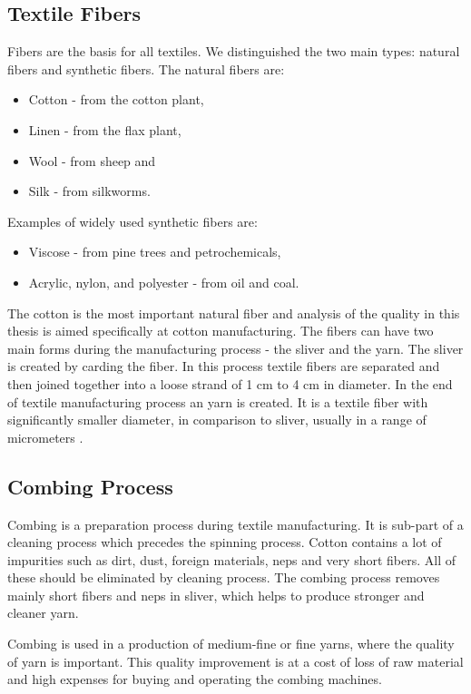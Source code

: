 \documentclass[twoside]{ctuthesis}
\theoremstyle{plain}
\theoremstyle{definition}
\theoremstyle{note}
\begin{document}
\subsection{Textile Fibers}
\label{textileFibers}
Fibers are the basis for all textiles. We distinguished the two main types: natural fibers and synthetic fibers. The natural fibers are:
\begin{itemize}
	\setlength{\itemsep}{5pt}
\item Cotton - from the cotton plant,
\item Linen - from the flax plant,
\item Wool - from sheep and
\item Silk - from silkworms.
\end{itemize}
Examples of widely used synthetic fibers are:
\begin{itemize}
	\setlength{\itemsep}{5pt}
\item Viscose - from pine trees and petrochemicals,

\item Acrylic, nylon, and polyester - from oil and coal. 
\end{itemize}
The cotton is the most important natural fiber and analysis of the quality in this thesis is aimed specifically at cotton manufacturing. 
The fibers can have two main forms during the manufacturing process - the sliver and the yarn. The sliver is created by carding the fiber. In this process textile fibers are separated and then joined together into a loose strand of 1 cm to 4 cm in diameter. In the end of textile manufacturing process an yarn is created. It is a textile fiber with significantly smaller diameter, in comparison to sliver, usually in a range of micrometers \cite{cite:FoFF}. 
\subsection{Combing Process}
Combing is a preparation process during textile manufacturing. It is sub-part of a cleaning process which precedes the spinning process. Cotton contains a lot of impurities such as dirt, dust, foreign materials, neps and very short fibers. All of these should be eliminated by cleaning process. The combing process removes mainly short fibers and neps in sliver, which helps to produce stronger and cleaner yarn.

Combing is used in a production of medium-fine or fine yarns, where the quality of yarn is important. This quality improvement is at a cost of loss of raw material and high expenses for buying and operating the combing machines. 
\end{document}
